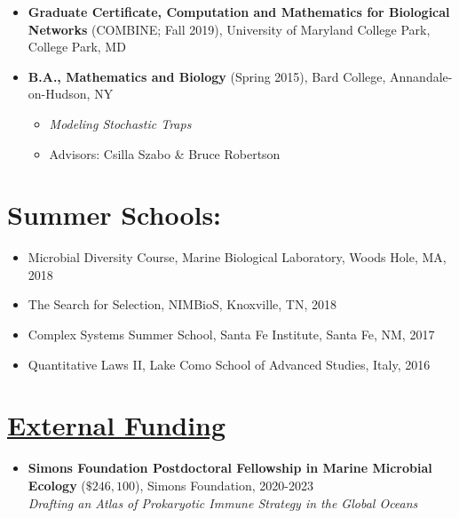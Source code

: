 \documentclass[]{res}
\begin{document}
\begin{resume}
\begin{itemize}[leftmargin=*]
\begin{itemize}[leftmargin=*]
\item[] {\bf Graduate Certificate, Computation and Mathematics for Biological Networks} (COMBINE; Fall 2019),
University of Maryland College Park, College Park, MD

\item[]  {\bf B.A., Mathematics and Biology}  (Spring 2015), Bard College, Annandale-on-Hudson, NY
\begin{itemize}
\item[] \emph{Modeling Stochastic Traps}%
\item[] Advisors: Csilla Szabo \& Bruce Robertson
\end{itemize}
\end{itemize}

 
\section{{Summer Schools:}}%
\begin{itemize}[leftmargin=*]
\item[] {Microbial Diversity Course}, Marine Biological Laboratory, Woods Hole, MA, 2018
\item[] {The Search for Selection}, NIMBioS, Knoxville, TN, 2018
\item[] {Complex Systems Summer School}, Santa Fe Institute, Santa Fe, NM, 2017
\item[] {Quantitative Laws II}, Lake Como School of Advanced Studies, Italy, 2016  
 \end{itemize}
 
 \end{itemize}
 
\section{\underline{External Funding}} %
\begin{itemize}[leftmargin=*]
\item[] {\bf Simons Foundation Postdoctoral Fellowship in Marine Microbial Ecology} ($\$246,100$), Simons Foundation, 2020-2023\\\emph{Drafting an Atlas of Prokaryotic Immune Strategy in the Global Oceans}


\end{itemize}
\end{resume}
\end{document}
